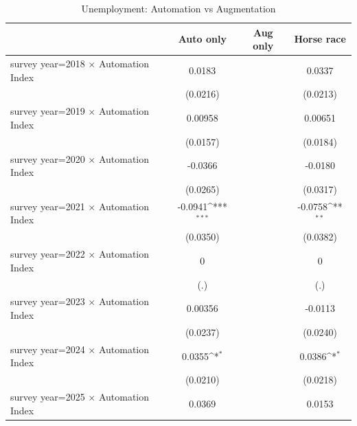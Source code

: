 \begin{table}[htbp]\centering
\def\sym#1{\ifmmode^{#1}\else\(^{#1}\)\fi}
\caption{Unemployment: Automation vs Augmentation}
\begin{tabular}{l*{3}{c}}
\toprule
                    &\multicolumn{1}{c}{Auto only}&\multicolumn{1}{c}{Aug only}&\multicolumn{1}{c}{Horse race}\\
\midrule
survey year=2018 $\times$ Automation Index&      0.0183         &                     &      0.0337         \\
                    &    (0.0216)         &                     &    (0.0213)         \\
\addlinespace
survey year=2019 $\times$ Automation Index&     0.00958         &                     &     0.00651         \\
                    &    (0.0157)         &                     &    (0.0184)         \\
\addlinespace
survey year=2020 $\times$ Automation Index&     -0.0366         &                     &     -0.0180         \\
                    &    (0.0265)         &                     &    (0.0317)         \\
\addlinespace
survey year=2021 $\times$ Automation Index&     -0.0941\sym{***}&                     &     -0.0758\sym{**} \\
                    &    (0.0350)         &                     &    (0.0382)         \\
\addlinespace
survey year=2022 $\times$ Automation Index&           0         &                     &           0         \\
                    &         (.)         &                     &         (.)         \\
\addlinespace
survey year=2023 $\times$ Automation Index&     0.00356         &                     &     -0.0113         \\
                    &    (0.0237)         &                     &    (0.0240)         \\
\addlinespace
survey year=2024 $\times$ Automation Index&      0.0355\sym{*}  &                     &      0.0386\sym{*}  \\
                    &    (0.0210)         &                     &    (0.0218)         \\
\addlinespace
survey year=2025 $\times$ Automation Index&      0.0369         &                     &      0.0153         \\

\end{tabular}
\end{table}
